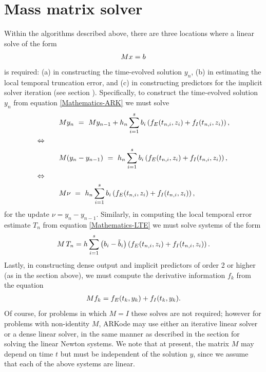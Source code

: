 \documentclass[letterpaper,10pt,english]{sphinxmanual}
\begin{document}
\section{Mass matrix solver}
\label{Mathematics:mass-matrix-solver}\label{Mathematics:mathematics-masssolve}
Within the algorithms described above, there are three locations where a
linear solve of the form
\begin{gather}
\begin{split}M x = b\end{split}\notag
\end{gather}
is required: (a) in constructing the time-evolved solution
\(y_n\), (b) in estimating the local temporal truncation error,
and (c) in constructing predictors for the implicit solver iteration
(see section {\hyperref[Mathematics:mathematics-predictors-max]{\emph{}}}).  Specifically, to
construct the time-evolved solution \(y_n\) from equation
\eqref{Mathematics-ARK} we must solve
\begin{gather}
\begin{split}&M y_n \ = \ M y_{n-1} + h_n \sum_{i=1}^{s} b_i \left(f_E(t_{n,i}, z_i)
              + f_I(t_{n,i}, z_i)\right), \\
\Leftrightarrow \qquad & \\
&M (y_n -y_{n-1}) \ = \ h_n \sum_{i=1}^{s} b_i \left(f_E(t_{n,i}, z_i)
              + f_I(t_{n,i}, z_i)\right), \\
\Leftrightarrow \qquad & \\
&M \nu \ = \ h_n \sum_{i=1}^{s} b_i \left(f_E(t_{n,i}, z_i)
              + f_I(t_{n,i}, z_i)\right),\end{split}\notag
\end{gather}
for the update \(\nu = y_n - y_{n-1}\).  Similarly, in computing
the local temporal error estimate \(T_n\) from equation \eqref{Mathematics-LTE}
we must solve systems of the form
\begin{gather}
\begin{split}M\, T_n = h \sum_{i=1}^{s} \left(b_i - \tilde{b}_i\right)
\left(f_E(t_{n,i}, z_i) + f_I(t_{n,i}, z_i)\right).\end{split}\notag
\end{gather}
Lastly, in constructing dense output and implicit predictors of order
2 or higher (as in the section {\hyperref[Mathematics:mathematics-predictors-max]{\emph{}}} above),
we must compute the derivative information \(f_k\) from the equation
\begin{gather}
\begin{split}M f_k = f_E(t_k, y_k) + f_I(t_k, y_k).\end{split}\notag
\end{gather}
Of course, for problems in which \(M=I\) these solves are not
required; however for problems with non-identity \(M\), ARKode may
use either an iterative linear solver or a dense linear solver, in the
same manner as described in the section {\hyperref[Mathematics:mathematics-linear]{\emph{}}} for solving
the linear Newton systems.  We note that at present, the matrix
\(M\) may depend on time \(t\) but must be independent of the
solution \(y\), since we assume that each of the above systems are
linear.
\end{document}
